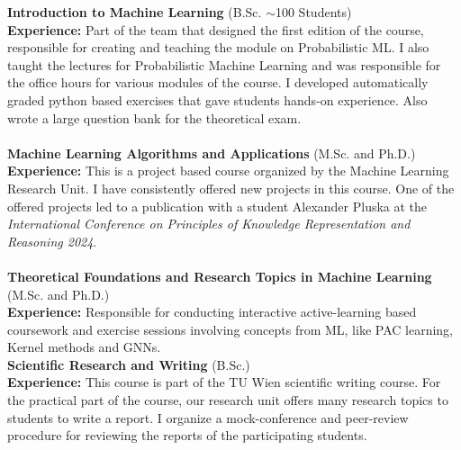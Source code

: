 \documentclass[10pt, a4paper]{article}
\newcommand{\years}[1]{\marginnote{\scriptsize #1}}
\begin{document}
\years{2023 - Now} \textbf{Introduction to Machine Learning} (B.Sc. $\sim$100 Students)\\
\textbf{Experience:} Part of the team that designed the first edition of the course, responsible for creating and teaching the module on Probabilistic ML. I also taught the lectures for Probabilistic Machine Learning and was responsible for the office hours for various modules of the course. I developed automatically graded python based exercises that gave students hands-on experience. Also wrote a large question bank for the theoretical exam. \\ \\
\years{2023 - Now} \textbf{Machine Learning Algorithms and Applications}
(M.Sc. and Ph.D.)\\
\textbf{Experience:} This is a project based course organized by the Machine Learning Research Unit. I have consistently offered new projects in this course. One of the offered projects led to a publication with a student Alexander Pluska at the \emph{International Conference on Principles of Knowledge Representation and Reasoning 2024}. \\ \\ 
 \years{2023 - Now} \textbf{Theoretical Foundations and Research Topics in Machine Learning} (M.Sc. and Ph.D.)\\
 \textbf{Experience:} Responsible for conducting interactive active-learning based coursework and exercise sessions involving concepts from ML, like PAC learning, Kernel methods and GNNs.\\

 \years{2023 - Now} \textbf{Scientific Research and Writing} (B.Sc.)\\ 
 \textbf{Experience:} This course is part of the TU Wien scientific writing course. For the practical part of the course, our research unit offers many research topics to students to write a report.
 I organize a mock-conference and peer-review procedure for reviewing the reports of the participating students.  
\end{document}
